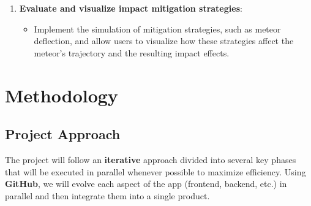\documentclass[conference]{IEEEtran}
\begin{document}
\begin{enumerate}
	\item \textbf{Evaluate and visualize impact mitigation strategies}:
	      \begin{itemize}
		      \item{ Implement the simulation of mitigation strategies, such as
		            meteor deflection, and allow users to visualize how these
		            strategies affect the meteor's trajectory and the resulting
		            impact effects.}
	      \end{itemize}
\end{enumerate}

\section{Methodology}
\subsection{Project Approach}
The project will follow an \textbf{iterative} approach divided into several key
phases that will be executed in parallel whenever possible to maximize
efficiency. Using \textbf{GitHub}, we will evolve each aspect of the app (frontend,
backend, etc.) in parallel and then integrate them into a single product.
\end{document}

